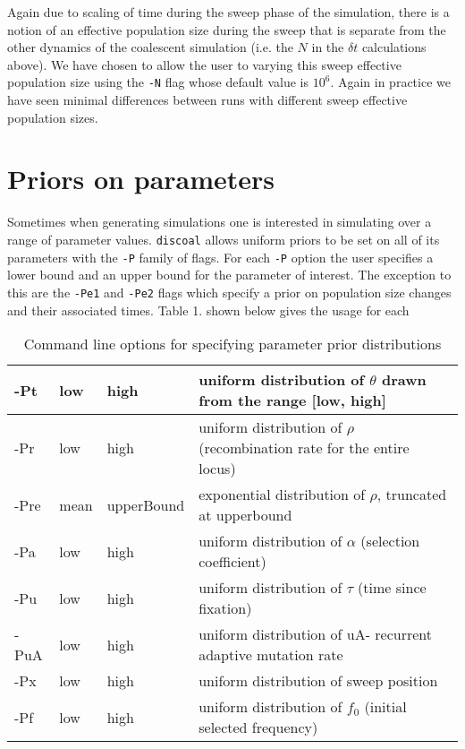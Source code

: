 \documentclass[12pt]{article}
\begin{document}
Again due to scaling of time during the sweep phase of the simulation, there is a notion of an effective population size during the sweep that is separate from the other dynamics of the coalescent simulation (i.e. the $N$ in the $\delta t$ calculations above). We have chosen to allow the user to varying this sweep effective population size using the \texttt{-N} flag whose default value is $10^6$. Again in practice we have seen minimal differences between runs with different sweep effective population sizes. 
   
\section*{Priors on parameters}
Sometimes when generating simulations one is interested in simulating over a range of parameter values. \texttt{discoal} allows uniform priors to be set on all of its parameters with the \texttt{-P} family of flags. For each \texttt{-P} option the user specifies a lower bound and an upper bound for the parameter of interest. The exception to this are the \texttt{-Pe1} and \texttt{-Pe2} flags which specify a prior on population size changes and their associated times. Table 1. shown below gives the usage for each


\begin{table}[hb]
\centering
\caption{Command line options for specifying parameter prior distributions}
\label{priortable}
\begin{tabular}{|l|l|l|l|}
\hline
-Pt  & low  & high       & uniform distribution of $\theta$ drawn from the range [low, high]     \\ \hline
-Pr  & low  & high       & uniform distribution of $\rho$ (recombination rate for the entire locus)     \\ \hline
-Pre & mean & upperBound & exponential distribution of $\rho$, truncated at upperbound \\ \hline
-Pa  & low  & high       & uniform distribution of $\alpha$ (selection coefficient)              \\ \hline
-Pu  & low  & high       & uniform distribution of $\tau$  (time since fixation)                  \\ \hline
-PuA & low  & high       & uniform distribution of uA- recurrent adaptive mutation rate          \\ \hline
-Px  & low  & high       & uniform distribution of sweep position                                \\ \hline
-Pf  & low  & high       & uniform distribution of $f_0$  (initial selected frequency)            \\ \hline
\end{tabular}
\end{table}
\end{document}
